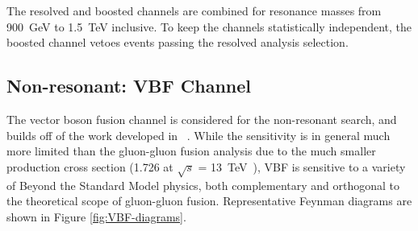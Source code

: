 The resolved and boosted channels are combined for resonance masses from \SI{900}{\GeV} 
to \SI{1.5}{\TeV} inclusive. To keep the channels statistically independent, the boosted channel 
vetoes events passing the resolved analysis selection.


\subsection{Non-resonant: VBF Channel} 
The vector boson fusion channel is considered for the non-resonant search, and builds off of the 
work developed in ~\cite{HDBS-2018-18}. While the 
sensitivity is in general much more limited than the gluon-gluon fusion analysis due to the 
much smaller production cross section (\SI{1.726}{\fb} at 
$\sqrt{s}$ = \SI{13}{\TeV}~\cite{HH1,HH2,HH3,HH4,HH5,HH6,HH7,HH8}), VBF is sensitive to a variety of Beyond the Standard 
Model physics, both complementary and orthogonal to the theoretical scope of gluon-gluon fusion. 
Representative Feynman diagrams are shown in Figure \ref{fig:VBF-diagrams}.
